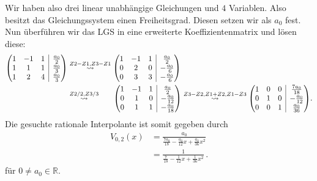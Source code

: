 \documentclass[10pt]{article}
\makeatletter
\newcommand{\R}{\mathbb{R}}
\newenvironment{amatrix}[1]{%
  \left(\begin{array}{@{}*{#1}{c}|c@{}}
}{%
  \end{array}\right)
}
\makeatother
\begin{document}
    Wir haben also drei linear unabhängige Gleichungen und $4$ Variablen. Also besitzt das Gleichungssystem einen 
    Freiheitsgrad. Diesen setzen wir als $a_0$ fest. Nun überführen wir das LGS in eine erweiterte Koeffizientenmatrix und
    lösen diese:
    \begin{align*}
        \begin{amatrix}{3}
            1 & -1 & 1 & \frac{a_0}{2} \\
            1 & 1  & 1 & \frac{a_0}{3} \\
            1 & 2  & 4 & \frac{a_0}{3}
        \end{amatrix}
        &\stackrel{Z2-Z1, Z3-Z1}{\rightsquigarrow}  
        \begin{amatrix}{3}
            1 & -1 &  1 & \frac{a_0}{2} \\
            0 &  2 &  0 & -\frac{a_0}{6} \\
            0 &  3 &  3 & -\frac{a_0}{6}
        \end{amatrix} \\
        &\stackrel{Z2/2, Z3/3}{\rightsquigarrow} \hspace*{0.6cm}
        \begin{amatrix}{3}
            1 & -1 &  1 & \frac{a_0}{2}  \\
            0 &  1 &  0 & -\frac{a_0}{12}  \\
            0 &  1 &  1 & -\frac{a_0}{18} 
        \end{amatrix} 
        \stackrel{Z3-Z2, Z1+Z2, Z1-Z3}{\rightsquigarrow}
        \begin{amatrix}{3}
            1 &  0 &  0 & \frac{7a_0}{18}   \\
            0 &  1 &  0 & -\frac{a_0}{12}  \\
            0 &  0 &  1 & \frac{a_0}{36} 
        \end{amatrix}.
    \end{align*}     
    Die gesuchte rationale Interpolante ist somit gegeben durch
    \begin{align*}
        V_{0,2}(x) &= \frac{a_0}{\frac{7a_0}{18} -\frac{a_0}{12}x + \frac{a_0}{36}x^2} \\
                &= \frac{1}{\frac{7}{18} -\frac{1}{12}x + \frac{1}{36}x^2}\,.
    \end{align*}
    für $0 \neq a_0\in\R$.
\end{document}
